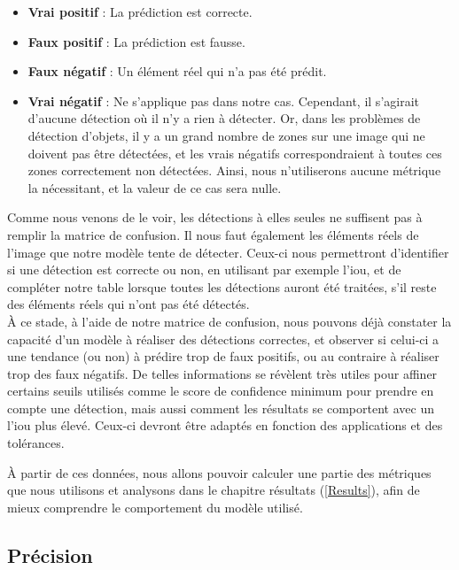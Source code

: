 \begin{itemize}
    \item \textbf{Vrai positif} : La prédiction est correcte.
    \item \textbf{Faux positif} : La prédiction est fausse.
    \item \textbf{Faux négatif} : Un élément réel qui n'a pas été prédit.
    \item \textbf{Vrai négatif} : Ne s'applique pas dans notre cas. Cependant, il s'agirait d'aucune détection où il n'y a rien à détecter. Or, dans les problèmes de détection d'objets, il y a un grand nombre de zones sur une image qui ne doivent pas être détectées, et les vrais négatifs correspondraient à toutes ces zones correctement non détectées. Ainsi, nous n'utiliserons aucune métrique la nécessitant, et la valeur de ce cas sera nulle.\\
\end{itemize}

Comme nous venons de le voir, les détections à elles seules ne suffisent pas à remplir la matrice de confusion. Il nous faut également les éléments réels de l'image que notre modèle tente de détecter. Ceux-ci nous permettront d'identifier si une détection est correcte ou non, en utilisant par exemple l'\acrshort{iou}, et de compléter notre table lorsque toutes les détections auront été traitées, s'il reste des éléments réels qui n'ont pas été détectés.\\

À ce stade, à l'aide de notre matrice de confusion, nous pouvons déjà constater la capacité d'un modèle à réaliser des détections correctes, et observer si celui-ci a une tendance (ou non) à prédire trop de faux positifs, ou au contraire à réaliser trop des faux négatifs. De telles informations se révèlent très utiles pour affiner certains seuils utilisés comme le score de confidence minimum pour prendre en compte une détection, mais aussi comment les résultats se comportent avec un l'\acrshort{iou} plus élevé. Ceux-ci devront être adaptés en fonction des applications et des tolérances.

À partir de ces données, nous allons pouvoir calculer une partie des métriques que nous utilisons et analysons dans le chapitre résultats (\ref{Results}), afin de mieux comprendre le comportement du modèle utilisé.

\subsection{Précision}


